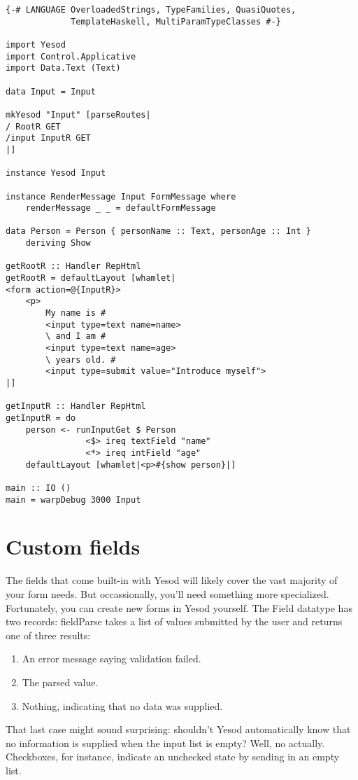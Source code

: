 \begin{lstlisting}
{-# LANGUAGE OverloadedStrings, TypeFamilies, QuasiQuotes,
             TemplateHaskell, MultiParamTypeClasses #-}

import Yesod
import Control.Applicative
import Data.Text (Text)

data Input = Input

mkYesod "Input" [parseRoutes|
/ RootR GET
/input InputR GET
|]

instance Yesod Input

instance RenderMessage Input FormMessage where
    renderMessage _ _ = defaultFormMessage

data Person = Person { personName :: Text, personAge :: Int }
    deriving Show

getRootR :: Handler RepHtml
getRootR = defaultLayout [whamlet|
<form action=@{InputR}>
    <p>
        My name is #
        <input type=text name=name>
        \ and I am #
        <input type=text name=age>
        \ years old. #
        <input type=submit value="Introduce myself">
|]

getInputR :: Handler RepHtml
getInputR = do
    person <- runInputGet $ Person
                <$> ireq textField "name"
                <*> ireq intField "age"
    defaultLayout [whamlet|<p>#{show person}|]

main :: IO ()
main = warpDebug 3000 Input
\end{lstlisting}

\section{Custom fields}

The fields that come built-in with Yesod will likely cover the vast majority of your form
needs. But occassionally, you'll need something more specialized. Fortunately, you can
create new forms in Yesod yourself. The Field datatype has two records: fieldParse takes a
list of values submitted by the user and returns one of three results:
\begin{enumerate}
 \item An error message saying validation failed.
 \item The parsed value.
 \item Nothing, indicating that no data was supplied.
\end{enumerate}

That last case might sound surprising: shouldn't Yesod automatically know that no
information is supplied when the input list is empty? Well, no actually. Checkboxes, for
instance, indicate an unchecked state by sending in an empty list.


